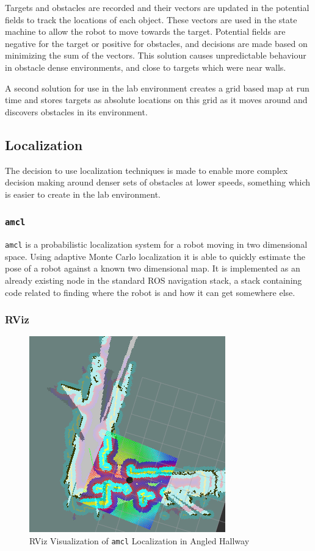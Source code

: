 \documentclass{article}[12]
\begin{document}
	Targets and obstacles are recorded and their vectors are updated in the potential fields to track the locations of each object. These vectors are used in the state machine to allow the robot to move towards the target. Potential fields are negative for the target or positive for obstacles, and decisions are made based on minimizing the sum of the vectors. This solution causes unpredictable behaviour in obstacle dense environments, and close to targets which were near walls.
	
	A second solution for use in the lab environment creates a grid based map at run time and stores targets as absolute locations on this grid as it moves around and discovers obstacles in its environment. 

	\subsection{Localization}
	
	The decision to use localization techniques is made to enable more complex decision making around denser sets of obstacles at lower speeds, something which is easier to create in the lab environment. 
	
	\subsubsection{\texttt{amcl}}
	
	\texttt{amcl} is a probabilistic localization system for a robot moving in two dimensional space. Using adaptive Monte Carlo localization \cite{doucet_freitas_gordon_2001} it is able to quickly estimate the pose of a robot against a known two dimensional map. It is implemented as an already existing node in the standard ROS navigation stack, a stack containing code related to finding where the robot is and how it can get somewhere else.
	
	\subsubsection{RViz}
	
	\begin{figure}[]
		\centering
		\includegraphics[width=0.5\linewidth]{rviz_screenshot}
		\caption{RViz Visualization of \texttt{amcl} Localization in Angled Hallway}
		\label{fig:rviz}
	\end{figure}
	
\end{document}
